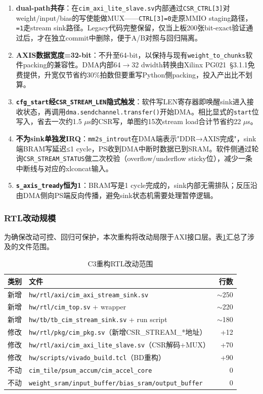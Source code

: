 \documentclass[12pt, a4paper]{article}
\begin{document}
\begin{enumerate}
    \item \textbf{dual-path共存}：在\texttt{cim\_axi\_lite\_slave.sv}内部通过\texttt{CSR\_CTRL[3]}对weight/input/bias的写使能做MUX——\texttt{CTRL[3]=0}走原MMIO staging路径，\texttt{=1}走stream sink路径。Legacy代码完整保留，仅当上板200张bit-exact验证通过后，才在独立commit中删除，便于A/B对照与回归隔离。
    \item \textbf{AXIS数据宽度=32-bit}：不升至64-bit，以保持与现有\texttt{weight\_to\_chunks}软件packing的兼容性。DMA内部64$\to$32 dwidth转换由Xilinx PG021~§3.1.1免费提供，升宽仅节省约30\%拍数但要重写Python侧packing，投入产出比不划算。
    \item \textbf{\texttt{cfg\_start}经\texttt{CSR\_STREAM\_LEN}隐式触发}：软件写LEN寄存器即唤醒sink进入接收状态，再调用\texttt{dma.sendchannel.transfer()}开始DMA。相比显式的\texttt{start}位写入，省去一次约1.5 $\mu$s的CSR写，单图约15次stream load合计节省约22 $\mu$s。
    \item \textbf{不为sink单独发IRQ}：\texttt{mm2s\_introut}在DMA端表示"DDR→AXIS完成"，sink端BRAM写延迟≤1 cycle，PS收到DMA中断时数据已到SRAM。软件侧通过轮询\texttt{CSR\_STREAM\_STATUS}做二次校验（overflow/underflow sticky位），减少一条中断线与对应的xlconcat输入。
    \item \textbf{\texttt{s\_axis\_tready}恒为1}：BRAM写是1 cycle完成的，sink内部无需排队；反压沿由DMA侧向PS端反向传播，避免sink状态机需要处理暂停逻辑。
\end{enumerate}

\subsubsection{RTL改动规模}

为确保改动可控、回归可保护，本次重构将改动局限于AXI接口层。表\ref{tab:c3_rtl_scope}汇总了涉及的文件范围。

\begin{table}[H]
    \centering
    \caption{C3重构RTL改动范围}
    \label{tab:c3_rtl_scope}
    \small
    \begin{tabular}{llr}
        \toprule
        类别 & 文件 & 行数 \\
        \midrule
        新增 & \texttt{hw/rtl/axi/cim\_axi\_stream\_sink.sv} & $\sim$250 \\
        新增 & \texttt{hw/rtl/cim\_top.sv} + wrapper & $\sim$220 \\
        新增 & \texttt{hw/tb/tb\_cim\_stream\_sink.sv} + run script & $\sim$180 \\
        修改 & \texttt{hw/rtl/pkg/cim\_pkg.sv}（新增CSR\_STREAM\_*地址） & +12 \\
        修改 & \texttt{hw/rtl/axi/cim\_axi\_lite\_slave.sv}（CSR解码+MUX） & +70 \\
        修改 & \texttt{hw/scripts/vivado\_build.tcl}（BD重构） & +90 \\
        \midrule
        不动 & \texttt{cim\_tile/psum\_accum/cim\_accel\_core} & 0 \\
        不动 & \texttt{weight\_sram/input\_buffer/bias\_sram/output\_buffer} & 0 \\
        \bottomrule
    \end{tabular}
\end{table}
\end{document}
